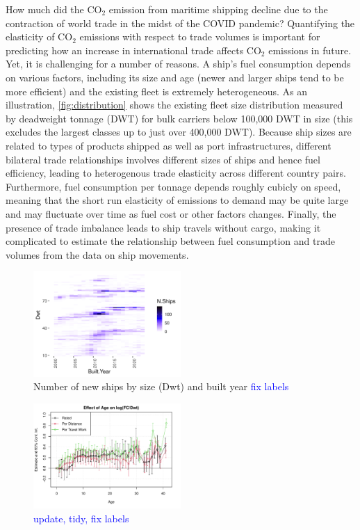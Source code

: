 \documentclass[hidelinks, 12pt,letterpaper]{article}
\begin{document}
How much did the CO$_2$ emission from maritime shipping decline due to the contraction of world trade in the midst of the COVID pandemic? 
Quantifying the elasticity of CO$_2$ emissions with respect to trade volumes is important for predicting how an increase in international trade affects CO$_2$ emissions in future. Yet, it is challenging for a number of reasons. A ship's fuel consumption depends on various factors, including its size and age (newer and larger ships tend to be more efficient) and the existing fleet is extremely heterogeneous. As an illustration, \autoref{fig:distribution} shows the existing fleet size distribution measured by deadweight tonnage (DWT) for bulk carriers below 100,000 DWT in size (this excludes the largest classes up to just over 400,000 DWT).  Because ship sizes are related to types of products shipped as well as port infrastructures, different bilateral trade relationships involves different sizes of ships  and hence  fuel efficiency, leading to heterogenous trade elasticity across different country pairs.  Furthermore, fuel consumption per tonnage depends roughly cubicly on speed, meaning that the short run elasticity of emissions to demand may be quite large and may fluctuate over time as fuel cost or other factors changes. Finally, the presence of trade imbalance leads to ship travels without cargo, making it complicated to estimate the relationship between fuel consumption and trade volumes from the data on ship movements.



\begin{figure}[h]
  \centering
  \includegraphics[width = 0.5\textwidth]{WFR_Bulkers_Exploration_Size_Built_heatmap.png}
  \caption{Number of new ships by size (Dwt) and built year \textcolor{blue}{fix labels}
}
  \label{fig:distribution}
\end{figure} 
\begin{figure}[h]
  \centering
  \includegraphics[width = 0.5\textwidth]{Efficiency_Regression_Size_Age_Coeffs_3.pdf}
  \caption{\textcolor{blue}{update, tidy, fix labels}}
  \label{fig:efficiency}
\end{figure} 
\end{document}
